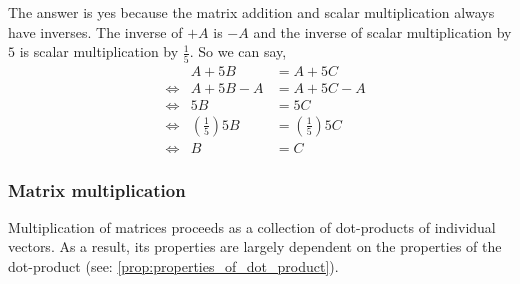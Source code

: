 \documentclass[../MathsNotesBase.tex]{subfiles}
\begin{document}
{		
		The answer is yes because the matrix addition and scalar multiplication always have inverses. The inverse of $+ A$ is $- A$ and the inverse of scalar multiplication by $5$ is scalar multiplication by $\frac{1}{5}$. So we can say,
		\begin{align*}
		&& A + 5B &= A + 5C\\[8pt]
		&\iff & A + 5B - A &= A + 5C - A\\[8pt]
		&\iff & 5B &= 5C\\[8pt]
		&\iff & \left(\frac{1}{5}\right)5B &= \left(\frac{1}{5}\right)5C\\[8pt]
		&\iff & B &= C
		\end{align*}
		
		
		
		\subsubsection{Matrix multiplication}\label{sssection:matrix_multiplication}
		Multiplication of matrices proceeds as a collection of dot-products of individual vectors. As a result, its properties are largely dependent on the properties of the dot-product (see: \ref{prop:properties_of_dot_product}).\\
			
}
\end{document}
